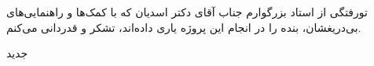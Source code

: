 


\begin{center}
\end{center}

‌تورفتگی از استاد بزرگوارم جناب آقای دکتر اسدیان که با کمک‌ها و راهنمایی‌های بی‌دریغشان، بنده را در انجام این پروژه یاری داده‌اند، تشکر و قدردانی می‌کنم.

‌جدید
